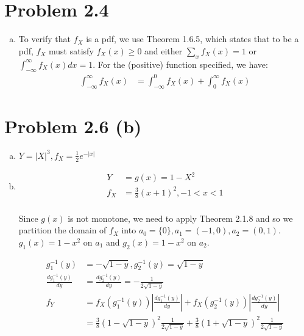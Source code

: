 \documentclass[11pt]{article}
\begin{document}
\section*{Problem 2.4}

\begin{enumerate}[(a)]
    \item To verify that $f_X$ is a pdf, we use Theorem 1.6.5, which states that to be a pdf, $f_X$ must satisfy $f_X(x) \ge 0$ and either $\sum_x f_X(x) = 1$ or $\int_{-\infty}^{\infty} f_X(x) dx = 1$.  For the (positive) function specified, we have:
        \begin{align*}
            \int_{-\infty}^{\infty} f_X(x) &= \int_{-\infty}^{0} f_X(x) + \int_{0}^{\infty} f_X(x)
        \end{align*}
\end{enumerate}

\section*{Problem 2.6 (b)}

\begin{enumerate}[(a)]
    \item $Y = |X|^3, f_X = \frac{1}{2} e^{-|x|}$
    \item 
        \begin{align*}
            Y &= g(x) = 1 - X^2 \\ 
            f_X &= \frac{3}{8}(x+1)^2, -1 < x < 1 \\
        \end{align*}
        
        Since $g(x)$ is not monotone, we need to apply Theorem 2.1.8 and so we partition the domain of $f_X$ into $a_0 = \{ 0 \}, a_1 = (-1, 0), a_2 = (0, 1)$. $g_1(x) = 1 - x^2$ on $a_1$ and $g_2(x) = 1 - x^2$ on $a_2$.
        
        \begin{align*}
            g_1^{-1}(y) &= -\sqrt{1 - y}, g_2^{-1}(y) = \sqrt{1 - y} \\
            \frac{dg_1^{-1}(y)}{dy} &= \frac{dg_2^{-1}(y)}{dy} = - \frac{1}{2 \sqrt{1 - y}} \\
            f_Y &= f_X(g_1^{-1}(y)) \left| \frac{dg_1^{-1}(y)}{dy} \right| + f_X(g_2^{-1}(y)) \left| \frac{dg_2^{-1}(y)}{dy} \right| \\
            &= \frac{3}{8}(1 - \sqrt{1 - y})^2 \frac{1}{2 \sqrt{1 - y}} + \frac{3}{8}(1 + \sqrt{1 - y})^2 \frac{1}{2 \sqrt{1 - y}}
        \end{align*}
\end{enumerate}
\end{document}
